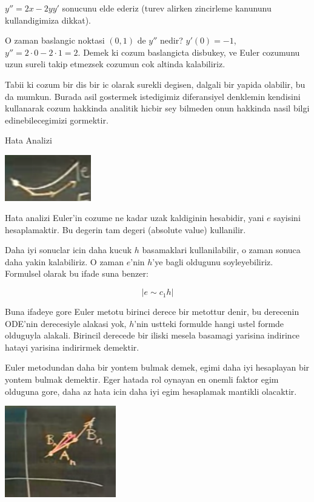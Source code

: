 \documentclass[12pt,fleqn]{article}
\begin{document}
$y'' = 2x - 2yy'$ sonucunu elde ederiz (turev alirken zincirleme kanununu
kullandigimiza dikkat).

O zaman baslangic noktasi $(0,1)$ de $y''$ nedir? $y'(0) = -1$, $y''= 2 \cdot 0
- 2\cdot 1 = 2$. 
Demek ki cozum baslangicta disbukey, ve Euler cozumunu uzun sureli takip
etmezsek cozumun cok altinda kalabiliriz. 

Tabii ki cozum bir dis bir ic olarak surekli degisen, dalgali bir yapida
olabilir, bu da mumkun. Burada asil gostermek istedigimiz diferansiyel denklemin
kendisini kullanarak cozum hakkinda analitik hicbir sey bilmeden onun hakkinda
nasil bilgi edinebilecegimizi gormektir. 

Hata Analizi

\includegraphics[height=2cm]{2_3.png}

Hata analizi Euler'in cozume ne kadar uzak kaldiginin hesabidir, yani $e$
sayisini hesaplamaktir. Bu degerin tam degeri (absolute value) kullanilir. 

Daha iyi sonuclar icin daha kucuk $h$ basamaklari kullanilabilir, o zaman sonuca
daha yakin kalabiliriz. O zaman $e$'nin $h$'ye bagli oldugunu
soyleyebiliriz. Formulsel olarak bu ifade suna benzer:

\[ |e \sim c_1 h| \]

Buna ifadeye gore Euler metotu birinci derece bir metottur denir, bu derecenin
ODE'nin derecesiyle alakasi yok, $h$'nin ustteki formulde hangi ustel formde
olduguyla alakali. Birincil derecede bir iliski mesela basamagi yarisina
indirince hatayi yarisina indirirmek demektir.

Euler metodundan daha bir yontem bulmak demek, egimi daha iyi hesaplayan bir
yontem bulmak demektir. Eger hatada rol oynayan en onemli faktor egim olduguna
gore, daha az hata icin daha iyi egim hesaplamak mantikli olacaktir. 

\includegraphics[height=4cm]{2_4.png}
\end{document}
